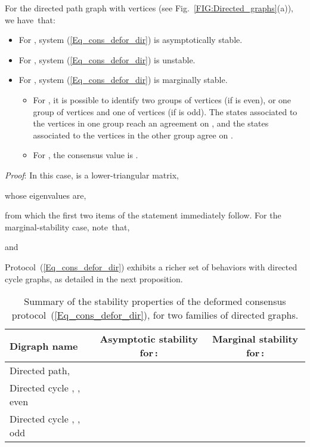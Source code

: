 \documentclass[letterpaper,9pt,twocolumn]{autart}
\begin{document}
\begin{proposition}\label{Prop_DirPath}
For the directed path graph with  vertices (see Fig.~\ref{FIG:Directed_graphs}(a)), we have~that:
\begin{itemize}
\item For , system (\ref{Eq_cons_defor_dir}) is asymptotically stable.
\item For , system (\ref{Eq_cons_defor_dir}) is unstable.
\item For , system (\ref{Eq_cons_defor_dir}) is marginally stable.
\begin{itemize}
\item For , it is possible to identify two groups of  vertices
(if  is even), or one group of  vertices
and one of  vertices (if  is odd).
The states associated to the vertices in one group reach an agreement on ,
and the states associated to the vertices in the other group
agree on .
\item For , the consensus value is .
\end{itemize}
\end{itemize}
\emph{Proof}:
In this case,  is a lower-triangular \mbox{matrix},\vspace{-0.23cm}

whose eigenvalues are,

from which the first two items of the statement \mbox{immediately}
follow. For the marginal-stability case, note~that,

and

\hfill
\end{proposition}
Protocol~(\ref{Eq_cons_defor_dir}) exhibits a richer set of behaviors with directed cycle graphs, as detailed in the next proposition. \begin{table*}[t!]
\renewcommand{\arraystretch}{1.42}
\begin{center}
  \begin{tabular}{|l|c|c|} \hline
    \textbf{Digraph name} & \textbf{Asymptotic stability for\,:} & \textbf{Marginal stability for\,:}\\
    \hline\hline
    Directed path,  &  & 
    \vspace{0.01cm}\\
    \hline
    Directed cycle , ,  even &  &  
     \vspace{0.01cm}\\
    \hline
    Directed cycle , ,  odd &  & 
     \vspace{0.01cm}\\
    \hline
  \end{tabular}
  \vspace{0.4cm}
  \caption{Summary of the stability properties of the deformed consensus protocol~(\ref{Eq_cons_defor_dir}),
  for two families of directed graphs.}\label{Table2}
\end{center}
\end{table*}
\end{document}
